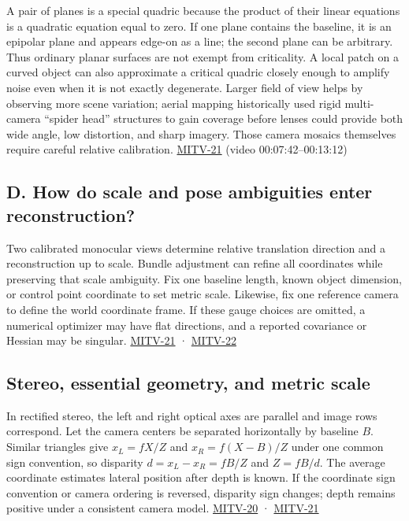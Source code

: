 A pair of planes is a special quadric because the product of their linear equations is a quadratic equation equal to zero. If one plane contains the baseline, it is an epipolar plane and appears edge-on as a line; the second plane can be arbitrary. Thus ordinary planar surfaces are not exempt from criticality. A local patch on a curved object can also approximate a critical quadric closely enough to amplify noise even when it is not exactly degenerate. Larger field of view helps by observing more scene variation; aerial mapping historically used rigid multi-camera ``spider head'' structures to gain coverage before lenses could provide both wide angle, low distortion, and sharp imagery. Those camera mosaics themselves require careful relative calibration. \hyperref[04-visual-computing-ii-ch036-mitv-21---relative-orientation-binocular-stereo-structure-quadrics-calibration-reprojection]{MITV-21} (video 00:07:42--00:13:12)

\subsection{D. How do scale and pose ambiguities enter reconstruction?}\label{04-visual-computing-ii-ch032-d.-how-do-scale-and-pose-ambiguities-enter-reconstruction}

Two calibrated monocular views determine relative translation direction and a reconstruction up to scale. Bundle adjustment can refine all coordinates while preserving that scale ambiguity. Fix one baseline length, known object dimension, or control point coordinate to set metric scale. Likewise, fix one reference camera to define the world coordinate frame. If these gauge choices are omitted, a numerical optimizer may have flat directions, and a reported covariance or Hessian may be singular. \hyperref[04-visual-computing-ii-ch036-mitv-21---relative-orientation-binocular-stereo-structure-quadrics-calibration-reprojection]{MITV-21} · \hyperref[04-visual-computing-ii-ch036-mitv-22---exterior-orientation-recovering-position-orientation-bundle-adjustment-object-shape]{MITV-22}

\subsection{Stereo, essential geometry, and metric scale}\label{04-visual-computing-ii-ch032-stereo-essential-geometry-and-metric-scale}

In rectified stereo, the left and right optical axes are parallel and image rows correspond. Let the camera centers be separated horizontally by baseline \(B\). Similar triangles give \(x_L=fX/Z\) and \(x_R=f(X-B)/Z\) under one common sign convention, so disparity \(d=x_L-x_R=fB/Z\) and \(Z=fB/d\). The average coordinate estimates lateral position after depth is known. If the coordinate sign convention or camera ordering is reversed, disparity sign changes; depth remains positive under a consistent camera model. \hyperref[04-visual-computing-ii-ch036-mitv-20---space-of-rotations-regular-tessellations-critical-surfaces-binocular-stereo]{MITV-20} · \hyperref[04-visual-computing-ii-ch036-mitv-21---relative-orientation-binocular-stereo-structure-quadrics-calibration-reprojection]{MITV-21}

